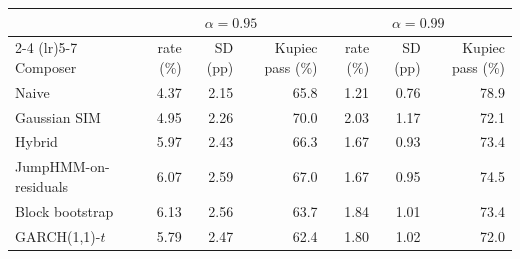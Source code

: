 \begin{tabular}{lrrrrrr}
\toprule
 & \multicolumn{3}{c}{$\alpha = 0.95$} & \multicolumn{3}{c}{$\alpha = 0.99$} \\
\cmidrule(lr){2-4} \cmidrule(lr){5-7}
Composer & rate (\%) & SD (pp) & Kupiec pass (\%) & rate (\%) & SD (pp) & Kupiec pass (\%) \\
\midrule
Naive & 4.37 & 2.15 & 65.8 & 1.21 & 0.76 & 78.9 \\
Gaussian SIM & 4.95 & 2.26 & 70.0 & 2.03 & 1.17 & 72.1 \\
Hybrid & 5.97 & 2.43 & 66.3 & 1.67 & 0.93 & 73.4 \\
JumpHMM-on-residuals & 6.07 & 2.59 & 67.0 & 1.67 & 0.95 & 74.5 \\
Block bootstrap & 6.13 & 2.56 & 63.7 & 1.84 & 1.01 & 73.4 \\
GARCH(1,1)-$t$ & 5.79 & 2.47 & 62.4 & 1.80 & 1.02 & 72.0 \\
\bottomrule
\end{tabular}
